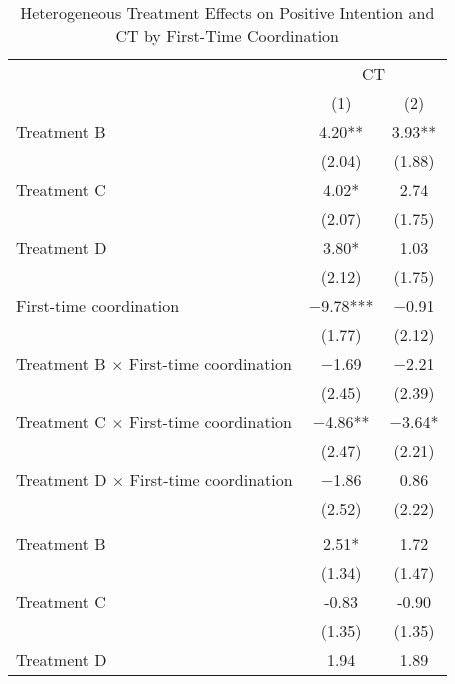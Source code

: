 \documentclass[12pt, a4paper]{article}
\begin{document}
\begin{table}[H]

\caption{\label{tab:lm-interaction-coordination-test}Heterogeneous Treatment Effects on Positive Intention and CT by First-Time Coordination}
\centering
\fontsize{8}{10}\selectfont
\begin{threeparttable}
\begin{tabular}[t]{>{\raggedright\arraybackslash}p{30em}cc}
\toprule
\multicolumn{1}{c}{ } & \multicolumn{2}{c}{CT} \\
\cmidrule(l{3pt}r{3pt}){2-3}
  & (1) & (2)\\
\midrule
Treatment B & \num{4.20}** & \num{3.93}**\\
 & (\num{2.04}) & (\num{1.88})\\
Treatment C & \num{4.02}* & \num{2.74}\\
 & (\num{2.07}) & (\num{1.75})\\
Treatment D & \num{3.80}* & \num{1.03}\\
 & (\num{2.12}) & (\num{1.75})\\
First-time coordination & \num{-9.78}*** & \num{-0.91}\\
 & (\num{1.77}) & (\num{2.12})\\
Treatment B $\times$ First-time coordination & \num{-1.69} & \num{-2.21}\\
 & (\num{2.45}) & (\num{2.39})\\
Treatment C $\times$ First-time coordination & \num{-4.86}** & \num{-3.64}*\\
 & (\num{2.47}) & (\num{2.21})\\
Treatment D $\times$ First-time coordination & \num{-1.86} & \num{0.86}\\
 & (\num{2.52}) & (\num{2.22})\\
\midrule
\addlinespace[0.3em]
\multicolumn{3}{l}{\textit{Linear combination test: Treatment + Treatment $\times$ First-Time Coordination}}\\
\hspace{1em}Treatment B & 2.51* & 1.72\\
\hspace{1em} & (1.34) & (1.47)\\
\hspace{1em}Treatment C & -0.83 & -0.90\\
\hspace{1em} & (1.35) & (1.35)\\
\hspace{1em}Treatment D & 1.94 & 1.89\\

\end{tabular}
\end{threeparttable}
\end{table}
\end{document}

